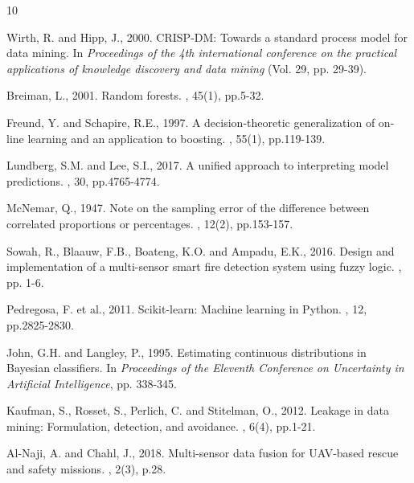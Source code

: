 \documentclass[12pt,a4paper]{article}
\begin{document}
\newpage


\begin{thebibliography}{10}

Wirth, R. and Hipp, J., 2000.
\newblock CRISP-DM: Towards a standard process model for data mining.
\newblock In {\em Proceedings of the 4th international conference on the practical applications of knowledge discovery and data mining} (Vol. 29, pp. 29-39).

Breiman, L., 2001.
\newblock Random forests.
, 45(1), pp.5-32.

Freund, Y. and Schapire, R.E., 1997.
\newblock A decision-theoretic generalization of on-line learning and an application to boosting.
, 55(1), pp.119-139.

Lundberg, S.M. and Lee, S.I., 2017.
\newblock A unified approach to interpreting model predictions.
, 30, pp.4765-4774.

McNemar, Q., 1947.
\newblock Note on the sampling error of the difference between correlated proportions or percentages.
, 12(2), pp.153-157.

Sowah, R., Blaauw, F.B., Boateng, K.O. and Ampadu, E.K., 2016.
\newblock Design and implementation of a multi-sensor smart fire detection system using fuzzy logic.
, pp. 1-6.

Pedregosa, F. et al., 2011.
\newblock Scikit-learn: Machine learning in Python.
, 12, pp.2825-2830.

John, G.H. and Langley, P., 1995.
\newblock Estimating continuous distributions in Bayesian classifiers.
\newblock In {\em Proceedings of the Eleventh Conference on Uncertainty in Artificial Intelligence}, pp. 338-345.

Kaufman, S., Rosset, S., Perlich, C. and Stitelman, O., 2012.
\newblock Leakage in data mining: Formulation, detection, and avoidance.
, 6(4), pp.1-21.

Al-Naji, A. and Chahl, J., 2018.
\newblock Multi-sensor data fusion for UAV-based rescue and safety missions.
, 2(3), p.28.

\end{thebibliography}
\end{document}
